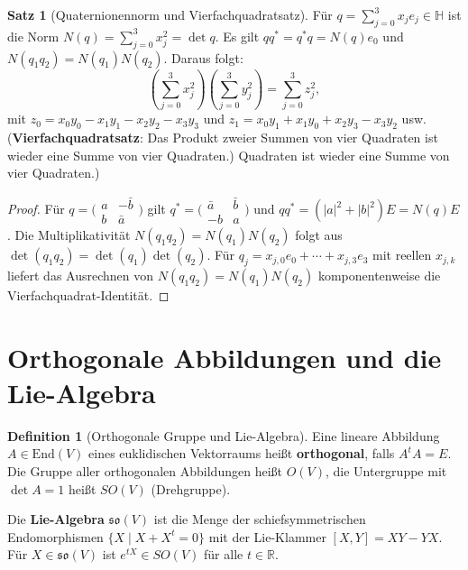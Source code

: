 ﻿\documentclass[a4paper,12pt]{report}
\theoremstyle{definition}
\newtheorem{definition}{Definition}
\newtheorem{satz}{Satz}
\begin{document}
\begin{satz}[Quaternionennorm und Vierfachquadratsatz]
    Für $q = \sum_{j=0}^3 x_j e_j \in \mathbb{H}$ ist die Norm
    $N(q) = \sum_{j=0}^3 x_j^2 = \det q$. Es gilt $qq^* = q^*q = N(q)e_0$
    und $N(q_1 q_2) = N(q_1) N(q_2)$. Daraus folgt:
    \[
        \left(\sum_{j=0}^3 x_j^2\right)\!\left(\sum_{j=0}^3 y_j^2\right)
        = \sum_{j=0}^3 z_j^2,
    \]
    mit $z_0 = x_0 y_0 - x_1 y_1 - x_2 y_2 - x_3 y_3$
    und $z_1 = x_0 y_1 + x_1 y_0 + x_2 y_3 - x_3 y_2$ usw.
    (\textbf{Vierfach\-quadrat\-satz}: Das Produkt zweier
    Summen von vier Quadraten ist wieder eine Summe von vier Quadraten.)
    Quadraten ist wieder eine Summe von vier Quadraten.)
\end{satz}
\begin{proof}
    Für $q = \bigl(\begin{smallmatrix} a & -\bar{b} \\ b & \bar{a} \end{smallmatrix}\bigr)$
    gilt $q^* = \bigl(\begin{smallmatrix} \bar{a} & \bar{b} \\ -b & a \end{smallmatrix}\bigr)$
    und $qq^* = (|a|^2 + |b|^2) E = N(q) E$.
    Die Multiplikativität $N(q_1 q_2) = N(q_1) N(q_2)$ folgt aus
    $\det(q_1 q_2) = \det(q_1) \det(q_2)$. Für $q_j = x_{j,0} e_0 + \cdots
    + x_{j,3} e_3$ mit reellen $x_{j,k}$ liefert das Ausrechnen von
    $N(q_1 q_2) = N(q_1) N(q_2)$ komponentenweise die Vierfachquadrat-Identität.
\end{proof}


\section{Orthogonale Abbildungen und die Lie-Algebra}

\begin{definition}[Orthogonale Gruppe und Lie-Algebra]
    Eine lineare Abbildung $A \in \mathrm{End}(V)$ eines euklidischen
    Vektorraums heißt \textbf{orthogonal}, falls $A^t A = E$.
    Die Gruppe aller orthogonalen Abbildungen heißt $O(V)$, die
    Untergruppe mit $\det A = 1$ heißt $SO(V)$ (Drehgruppe).

    Die \textbf{Lie-Algebra} $\mathfrak{so}(V)$ ist die Menge der
    schiefsymmetrischen Endomorphismen $\{X \mid X + X^t = 0\}$
    mit der Lie-Klammer $[X, Y] = XY - YX$.
    Für $X \in \mathfrak{so}(V)$ ist $e^{tX} \in SO(V)$ für alle $t \in \mathbb{R}$.
\end{definition}
\end{document}
